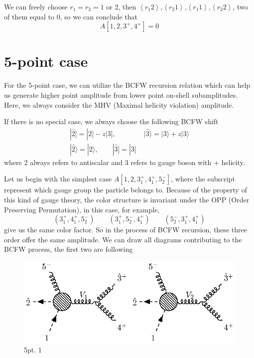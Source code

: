\documentclass[12pt]{article}
\newcommand{\avg}[1]{\left\langle #1 \right\rangle}
\newcommand{\aket}[1]{|#1\rangle}
\newcommand{\sket}[1]{|#1]}
\begin{document}
We can freely choose $r_1=r_2=1$ or 2, then $\avg{r_1 2}$,$\avg{r_2 1}$,$\avg{r_1 1}$,$\avg{r_2 2}$, two of them equal to 0, so we can conclude that
\begin{equation*}
    A[1,2,3^+,4^+]=0
\end{equation*}
\section{5-point case}
For the 5-point case, we can utilize the BCFW recursion relation which can help us generate higher point amplitude from lower point on-shell subamplitudes. Here, 
we always consider the MHV (Maximal helicity violation) amplitude. 
\par
If there is no special case, we always choose the following BCFW shift
\begin{gather*}
    \sket{\hat{2}}=\sket{2}-z\sket{3},\qquad \qquad \aket{\hat{3}}=\aket{3}+z\aket{3}\\
    \aket{\hat{2}}=\aket{2}, \qquad \sket{\hat{3}}=\sket{3}
\end{gather*}
where 2 always refers to antiscalar and 3 refers to gauge boson with + helicity.
\par
Let us begin with the simplest case $A[1,2,3_1^+,4_1^+,5_2^-]$, where the subscript represent which gauge group the particle belongs to. Because of the property 
of this kind of gauge theory, the color structure is invariant under the OPP (Order Preserving Permutation), in this case, for example,
\begin{equation*}
    (3_1^+,4_1^+,5_2^-)\qquad (3_1^+,5_2^-,4_1^+)\qquad(5_2^-,3_1^+,4_1^+)
\end{equation*}
give us the same color factor. So in the process of BCFW recursion, these three order offer the same amplitude. We can draw all diagrams contributing to the BCFW process, the first two are following
\par
\begin{figure}[H]
    \centering
    \includegraphics{5pt1.eps}
    \caption{5pt. 1}
    \label{2}
\end{figure}
\end{document}

